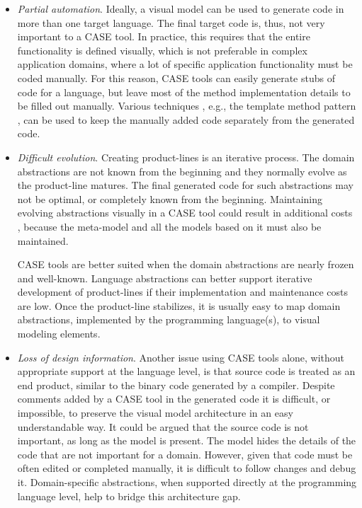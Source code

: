 \begin{itemize}
\item \textit{Partial automation}. Ideally, a visual model can be used to generate code in more than one target language. The final target code is, thus, not very important to a CASE tool. In practice, this requires that the entire functionality is defined visually, which is not preferable in complex application domains, where a lot of specific application functionality must be coded manually. For this reason, CASE tools can easily generate stubs of code for a language, but leave most of the method implementation details to be filled out manually. Various techniques \cite{voelter.generation}, e.g., the template method pattern \cite{dpatterns}, can be used to keep the manually added code separately from the generated code.

\item \textit{Difficult evolution}. Creating product-lines is an iterative process. The domain abstractions are not known from the beginning and they normally evolve as the product-line matures. The final generated code for such abstractions may not be optimal, or completely known from the beginning. Maintaining evolving abstractions visually in a CASE tool could result in additional costs \cite{lop.94}, because the meta-model and all the models based on it must also be maintained.

CASE tools are better suited when the domain abstractions are nearly frozen and well-known. Language abstractions can better support iterative development of product-lines if their implementation and maintenance costs are low. Once the product-line stabilizes, it is usually easy to map domain abstractions, implemented by the programming language(s), to visual modeling elements.

\item \textit{Loss of design information}. Another issue using CASE tools alone, without appropriate support at the language level, is that source code is treated as an end product, similar to the binary code generated by a compiler. Despite comments added by a CASE tool in the generated code it is difficult, or impossible, to preserve the visual model architecture in an easy understandable way. It could be argued that the source code is not important, as long as the model is present. The model hides the details of the code that are not important for a domain. However, given that code must be often edited or completed manually, it is difficult to follow changes and debug it. %
Domain-specific abstractions, when supported directly at the programming language level, help to bridge this architecture gap.

\end{itemize}

